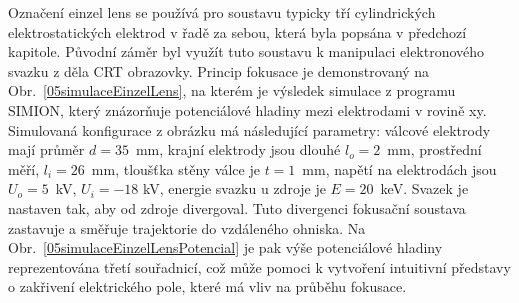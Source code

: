 Označení einzel lens se používá pro soustavu typicky tří cylindrických elektrostatických elektrod v řadě za sebou, která byla popsána v předchozí kapitole. Původní záměr byl využít tuto soustavu k manipulaci elektronového svazku z děla CRT obrazovky.
Princip fokusace je demonstrovaný na Obr.~\ref{05simulaceEinzelLens}, na kterém je výsledek simulace z programu SIMION, který znázorňuje potenciálové hladiny mezi elektrodami v rovině xy. Simulovaná konfigurace z obrázku má následující parametry: válcové elektrody mají průměr $d=35$~mm, krajní elektrody jsou dlouhé $l_o = 2$~mm, prostřední měří, $l_i = 26$~mm, tloušťka stěny válce je $t=1$~mm, napětí na elektrodách jsou $U_o = 5$~kV, $U_i = -18$ kV, energie svazku u zdroje je $E = 20$~keV. Svazek je nastaven tak, aby od zdroje divergoval. Tuto divergenci fokusační soustava zastavuje a směřuje trajektorie do vzdáleného ohniska. Na Obr.~\ref{05simulaceEinzelLensPotencial} je pak výše potenciálové hladiny reprezentována třetí souřadnicí, což může pomoci k vytvoření intuitivní představy o zakřivení elektrického pole, které má vliv na průběhu fokusace.\\

